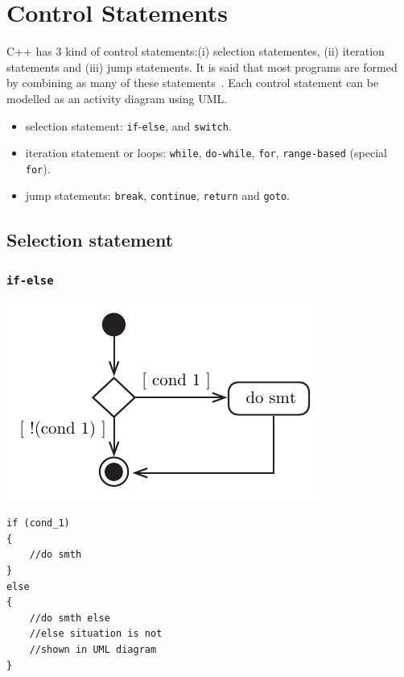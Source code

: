 \section{Control Statements}

C++ has 3 kind of control statements:(i) selection statementes, (ii) iteration statements and (iii) jump statements. It is said that most programs are formed by combining as many of these statements~\cite{deitel2017c++}. Each control statement can be modelled as an activity diagram using \ac{UML}.

\begin{itemize}
    \item selection statement: \texttt{if}-\texttt{else}, and \texttt{switch}.
    \item iteration statement or loops: \texttt{while}, \texttt{do-while}, \texttt{for}, \texttt{range-based} (special \texttt{for}).
    \item jump statements: \texttt{break}, \texttt{continue}, \texttt{return} and \texttt{goto}.
\end{itemize}

\subsection{Selection statement}
\subsubsection{\texttt{if-else}}

\begin{minipage}{.50\textwidth}
\centering
\includegraphics[width=0.65\linewidth]{01_Basics/figures/uml/SelectionStatement-00-UML-if-else.pdf}
\label{fig:ch01_Basics_UML_SelStatement-00-if-else}
\end{minipage}
\begin{minipage}{.25\textwidth}
\begin{lstlisting}[frame=tlrb,numbers=none,mathescape=true,escapechar=\%,columns=flexible]
if (cond_1)
{
    //do smth
}
else
{
    //do smth else
    //else situation is not
    //shown in UML diagram
}
\end{lstlisting}
\end{minipage}
\vspace{0.5cm}


